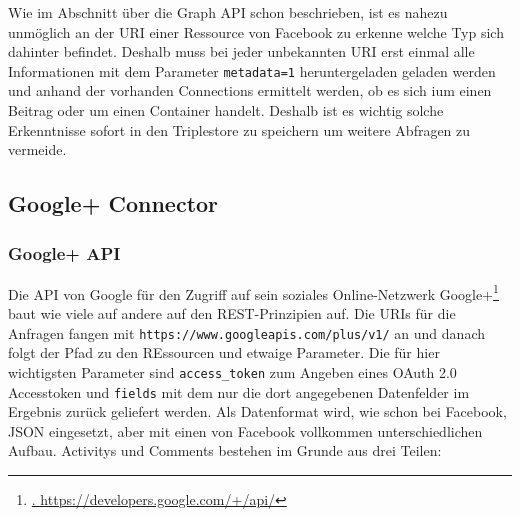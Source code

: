 Wie im Abschnitt über die Graph API schon beschrieben, ist es nahezu unmöglich an der URI einer Ressource von Facebook zu erkenne welche Typ sich dahinter befindet. Deshalb muss bei jeder unbekannten URI erst einmal alle Informationen mit dem Parameter \texttt{metadata=1} heruntergeladen geladen werden und anhand der vorhanden Connections ermittelt werden, ob es sich ium einen Beitrag oder um einen Container handelt. Deshalb ist es wichtig solche Erkenntnisse sofort in den Triplestore zu speichern um weitere Abfragen zu vermeide.



\subsection{Google+ Connector} %
\label{sub:google_plus_connector}


\subsubsection{Google+ API} %
\label{ssub:google_api}

Die API von Google für den Zugriff auf sein soziales Online-Netzwerk Google+\footnote{\url{. https://developers.google.com/+/api/}} baut wie viele auf andere auf den REST-Prinzipien auf. Die URIs für die Anfragen fangen mit \texttt{https://www.googleapis.com/plus/v1/} an und danach folgt der Pfad zu den REssourcen und etwaige Parameter. Die für hier wichtigsten Parameter sind \texttt{access\_token} zum Angeben eines OAuth 2.0 Accesstoken und \texttt{fields} mit dem nur die dort angegebenen Datenfelder im Ergebnis zurück geliefert werden. Als Datenformat wird, wie schon bei Facebook, JSON eingesetzt, aber mit einen von Facebook vollkommen unterschiedlichen Aufbau. Activitys und Comments bestehen im Grunde aus drei Teilen:

